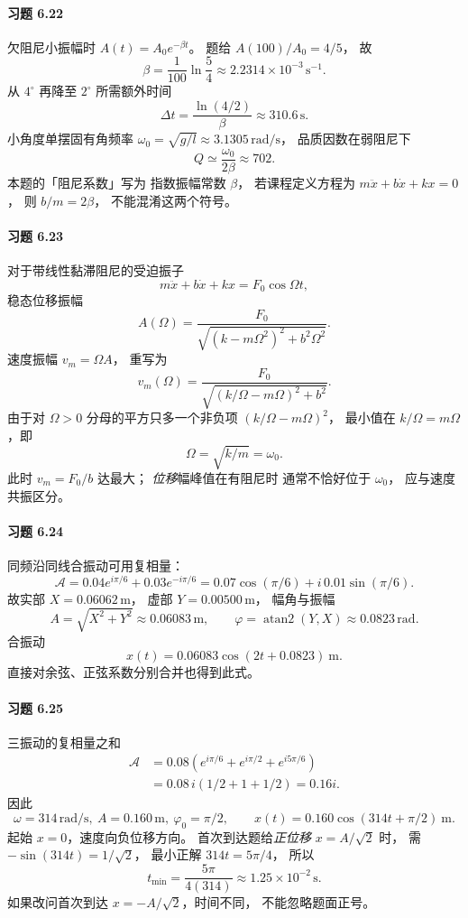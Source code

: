 \paragraph{习题 6.22}
欠阻尼小振幅时
\(A(t)=A_0e^{-\beta t}\)。
题给 \(A(100)/A_0=4/5\)，
故
\[
 \boxed{\beta=\frac1{100}
 \ln\frac54\approx2.2314\times10^{-3}\,\mathrm{s^{-1}}}.
\]
从 \(4^\circ\) 再降至 \(2^\circ\)
所需额外时间
\[
 \boxed{\Delta t=\frac{\ln(4/2)}{\beta}
 \approx310.6\,\mathrm s}.
\]
小角度单摆固有角频率
\(\omega_0=\sqrt{g/l}\approx3.1305\,\mathrm{rad/s}\)，
品质因数在弱阻尼下
\[
 \boxed{Q\simeq\frac{\omega_0}{2\beta}
 \approx702}.
\]
本题的「阻尼系数」写为
指数振幅常数 \(\beta\)，
若课程定义方程为
\(m\ddot x+b\dot x+kx=0\)，
则 \(b/m=2\beta\)，
不能混淆这两个符号。

\paragraph{习题 6.23}
对于带线性黏滞阻尼的受迫振子
\[
 m\ddot x+b\dot x+kx=F_0\cos\Omega t,
\]
稳态位移振幅
\[
 A(\Omega)=\frac{F_0}
 {\sqrt{(k-m\Omega^2)^2+b^2\Omega^2}}.
\]
速度振幅 \(v_m=\Omega A\)，
重写为
\[
 v_m(\Omega)=\frac{F_0}
 {\sqrt{(k/\Omega-m\Omega)^2+b^2}}.
\]
由于对 \(\Omega>0\)
分母的平方只多一个非负项
\((k/\Omega-m\Omega)^2\)，
最小值在
\(k/\Omega=m\Omega\)，即
\[
 \boxed{\Omega=\sqrt{k/m}=\omega_0}.
\]
此时 \(v_m=F_0/b\) 达最大；
\emph{位移}幅峰值在有阻尼时
通常不恰好位于 \(\omega_0\)，
应与速度共振区分。

\paragraph{习题 6.24}
同频沿同线合振动可用复相量：
\[
 \mathcal A=0.04e^{i\pi/6}
 +0.03e^{-i\pi/6}
 =0.07\cos(\pi/6)+i\,0.01\sin(\pi/6).
\]
故实部
\(X=0.06062\,\mathrm m\)，
虚部 \(Y=0.00500\,\mathrm m\)，
幅角与振幅
\[
 \boxed{A=\sqrt{X^2+Y^2}
 \approx0.06083\,\mathrm m},\qquad
 \boxed{\varphi=\operatorname{atan2}(Y,X)
 \approx0.0823\,\mathrm{rad}}.
\]
合振动
\[
 \boxed{x(t)=0.06083\cos(2t+0.0823)\ \mathrm m}.
\]
直接对余弦、正弦系数分别合并也得到此式。

\paragraph{习题 6.25}
三振动的复相量之和
\[
 \begin{aligned}
 \mathcal A
 &=0.08\left(e^{i\pi/6}+e^{i\pi/2}
 +e^{i5\pi/6}\right)\\
 &=0.08\,i(1/2+1+1/2)=0.16i.
 \end{aligned}
\]
因此
\[
 \boxed{\omega=314\,\mathrm{rad/s},\
 A=0.160\,\mathrm m,\ \varphi_0=\pi/2},\qquad
 \boxed{x(t)=0.160\cos(314t+\pi/2)\ \mathrm m}.
\]
起始 \(x=0\)，速度向负位移方向。
首次到达题给\emph{正位移}
\(x=A/\sqrt2\) 时，
需 \(-\sin(314t)=1/\sqrt2\)，
最小正解
\(314t=5\pi/4\)，
所以
\[
 \boxed{t_{\min}=\frac{5\pi}{4(314)}
 \approx1.25\times10^{-2}\,\mathrm s}.
\]
如果改问首次到达
\(x=-A/\sqrt2\)，时间不同，
不能忽略题面正号。

